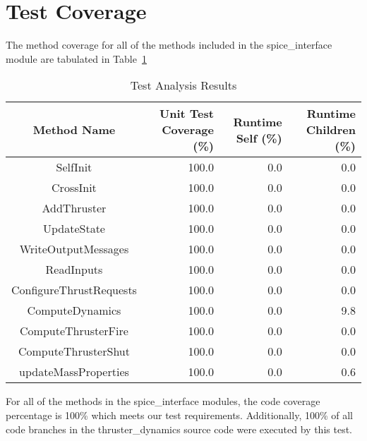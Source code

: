 \documentclass[]{BasiliskReportMemo}
\begin{document}
\section{Test Coverage}
The method coverage for all of the methods included in the spice\_interface 
module are tabulated in Table~\ref{tab:cov_met}

\begin{table}[htbp]
    \caption{Test Analysis Results}
   \label{tab:cov_met}
        \centering \fontsize{10}{10}\selectfont
   \begin{tabular}{c | r | r | r} %
      \hline
      Method Name    & Unit Test Coverage (\%) & Runtime Self (\%) & Runtime Children (\%) \\
      \hline
      SelfInit & 100.0 & 0.0 & 0.0 \\
      CrossInit & 100.0 & 0.0 & 0.0 \\
      AddThruster & 100.0 & 0.0 & 0.0 \\
      UpdateState & 100.0 & 0.0 & 0.0 \\
      WriteOutputMessages & 100.0 & 0.0 & 0.0 \\
      ReadInputs & 100.0 & 0.0 & 0.0 \\
      ConfigureThrustRequests & 100.0 & 0.0 & 0.0 \\
      ComputeDynamics & 100.0 & 0.0 & 9.8 \\
      ComputeThrusterFire & 100.0 & 0.0 & 0.0 \\
      ComputeThrusterShut & 100.0 & 0.0 & 0.0 \\
      updateMassProperties & 100.0 & 0.0 & 0.6 \\
      \hline
   \end{tabular}
\end{table}

For all of the methods in the spice\_interface modules, the code coverage 
percentage is 100\% which meets our test requirements.  Additionally, 100\% of 
all code branches in the thruster\_dynamics source code were executed by this 
test.

\end{document}
